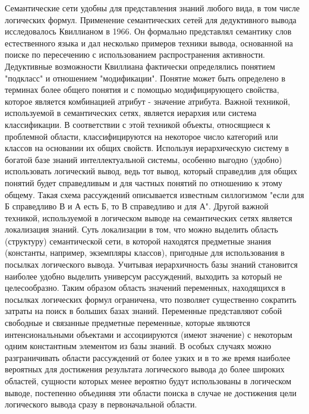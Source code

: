 Семантические сети удобны для представления знаний любого вида, в том числе логических формул. Применение семантических сетей для дедуктивного вывода исследовалось Квиллианом в 1966. Он формально представлял семантику слов естественного языка и дал несколько примеров техники вывода, основанной на поиске по пересечению с использованием распространения активности. Дедуктивные возможности Квиллиана фактически определялись понятием "подкласс" и отношением "модификации". Понятие может быть определено в терминах более общего понятия и с помощью модифицирующего свойства, которое является комбинацией атрибут - значение атрибута.
Важной техникой, используемой в семантических сетях, является иерархия или система классификации. В соответствии с этой техникой объекты, относящиеся к проблемной области, классифицируются на некоторое число категорий или классов на основании их общих свойств. Используя иерархическую систему в богатой базе знаний интеллектуальной системы, особенно выгодно (удобно) использовать логический вывод, ведь тот вывод, который справедлив для общих понятий будет справедливым и для частных понятий по отношению к этому общему. Такая схема рассуждений описывается известным силлогизмом "если для Б справедливо В и А есть Б, то В справедливо и для А". 
Другой важной техникой, используемой в логическом выводе на семантических сетях является локализация знаний. Суть локализации в том, что можно выделить область (структуру) семантической сети, в которой находятся предметные знания (константы, например, экземпляры классов), пригодные для использования в посылках логического вывода. Учитывая иерархичность базы знаний становится наиболее удобно выделить универсум рассуждений, выходить за который не целесообразно. Таким образом область значений переменных, находящихся в посылках логических формул ограничена, что позволяет существенно сократить затраты на поиск в больших базах знаний. 
Переменные представляют собой свободные и связанные предметные переменные, которые являются интенсиональными объектами и ассоциируются (имеют значение) с некоторым одним константным элементом из базы знаний. 
В особых случаях можно разграничивать области рассуждений от более узких и в то же время наиболее вероятных для достижения результата логического вывода до более широких областей, сущности которых менее вероятно будут использованы в логическом выводе, постепенно объединяя эти области поиска в случае не достижения цели логического вывода сразу в первоначальной области.

